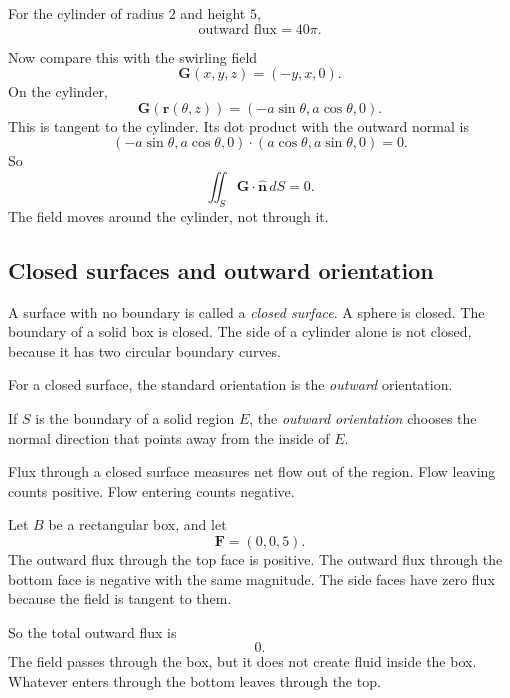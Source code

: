 For the cylinder of radius \(2\) and height \(5\),
\[
\boxed{
    \text{outward flux}=40\pi.
}
\]

Now compare this with the swirling field
\[
    \mathbf G(x,y,z)=(-y,x,0).
\]
On the cylinder,
\[
    \mathbf G(\mathbf r(\theta,z))=(-a\sin\theta,a\cos\theta,0).
\]
This is tangent to the cylinder.  Its dot product with the outward normal is
\[
    (-a\sin\theta,a\cos\theta,0)\cdot(a\cos\theta,a\sin\theta,0)=0.
\]
So
\[
\boxed{
    \iint_S \mathbf G\cdot\widehat{\mathbf n}\,dS=0.
}
\]
The field moves around the cylinder, not through it.

\subsection{Closed surfaces and outward orientation}

A surface with no boundary is called a \emph{closed surface}.  A sphere is closed.  The
boundary of a solid box is closed.  The side of a cylinder alone is not closed, because it
has two circular boundary curves.

For a closed surface, the standard orientation is the \emph{outward} orientation.

\begin{definition}
If \(S\) is the boundary of a solid region \(E\), the \emph{outward orientation} chooses
the normal direction that points away from the inside of \(E\).
\end{definition}

Flux through a closed surface measures net flow out of the region.  Flow leaving counts
positive.  Flow entering counts negative.

\begin{example}
Let \(B\) be a rectangular box, and let
\[
    \mathbf F=(0,0,5).
\]
The outward flux through the top face is positive.  The outward flux through the bottom
face is negative with the same magnitude.  The side faces have zero flux because the
field is tangent to them.

So the total outward flux is
\[
\boxed{
    0.
}
\]
The field passes through the box, but it does not create fluid inside the box.  Whatever
enters through the bottom leaves through the top.
\end{example}

